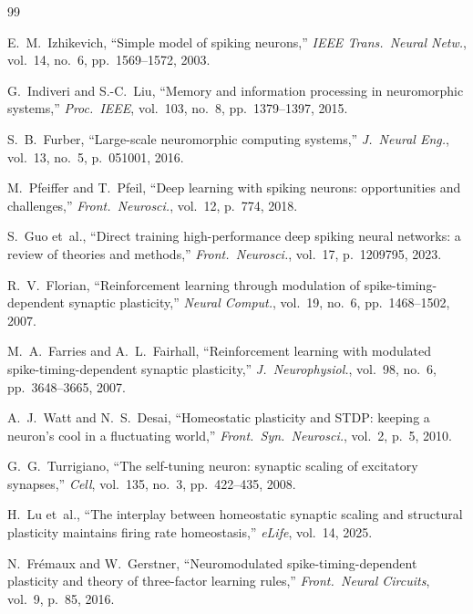 \documentclass[journal,twocolumn]{IEEEtran}
\begin{document}
\begin{thebibliography}{99}

E.~M.~Izhikevich, ``Simple model of spiking neurons,'' \emph{IEEE
Trans.\ Neural Netw.}, vol.~14, no.~6, pp.~1569--1572, 2003.

G.~Indiveri and S.-C.~Liu, ``Memory and information processing in
neuromorphic systems,'' \emph{Proc.\ IEEE}, vol.~103, no.~8,
pp.~1379--1397, 2015.

S.~B.~Furber, ``Large-scale neuromorphic computing systems,''
\emph{J.\ Neural Eng.}, vol.~13, no.~5, p.~051001, 2016.

M.~Pfeiffer and T.~Pfeil, ``Deep learning with spiking neurons:
opportunities and challenges,'' \emph{Front.\ Neurosci.}, vol.~12,
p.~774, 2018.

S.~Guo et~al., ``Direct training high-performance deep spiking neural
networks: a review of theories and methods,'' \emph{Front.\
Neurosci.}, vol.~17, p.~1209795, 2023.

R.~V.~Florian, ``Reinforcement learning through modulation of
spike-timing-dependent synaptic plasticity,'' \emph{Neural Comput.},
vol.~19, no.~6, pp.~1468--1502, 2007.

M.~A.~Farries and A.~L.~Fairhall, ``Reinforcement learning with
modulated spike-timing-dependent synaptic plasticity,''
\emph{J.\ Neurophysiol.}, vol.~98, no.~6, pp.~3648--3665, 2007.

A.~J.~Watt and N.~S.~Desai, ``Homeostatic plasticity and STDP:
keeping a neuron's cool in a fluctuating world,''
\emph{Front.\ Syn.\ Neurosci.}, vol.~2, p.~5, 2010.

G.~G.~Turrigiano, ``The self-tuning neuron: synaptic scaling of
excitatory synapses,'' \emph{Cell}, vol.~135, no.~3,
pp.~422--435, 2008.

H.~Lu et~al., ``The interplay between homeostatic synaptic scaling and
structural plasticity maintains firing rate homeostasis,''
\emph{eLife}, vol.~14, 2025.

N.~Fr\'{e}maux and W.~Gerstner, ``Neuromodulated spike-timing-dependent
plasticity and theory of three-factor learning rules,''
\emph{Front.\ Neural Circuits}, vol.~9, p.~85, 2016.


\end{thebibliography}
\end{document}
